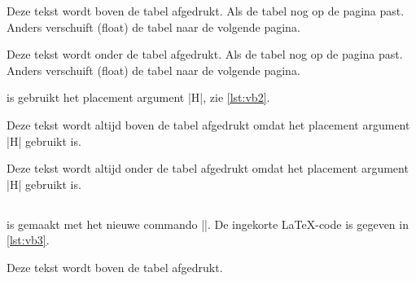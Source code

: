 \begin{llstShortInline}

	Deze tekst wordt boven de tabel afgedrukt. Als de tabel nog op de pagina past. Anders verschuift (float) de tabel naar de volgende pagina.

	
	Deze tekst wordt onder de tabel afgedrukt. Als de tabel nog op de pagina past. Anders verschuift (float) de tabel naar de volgende pagina.

	 is gebruikt het placement argument |H|, zie \cref{lst:vb2}.
	
	
	Deze tekst wordt altijd boven de tabel afgedrukt omdat het placement argument |H| gebruikt is.

	
	Deze tekst wordt altijd onder de tabel afgedrukt omdat het  placement argument |H| gebruikt is.
	
	\clearpage
	\subsection{\texorpdfstring{\lcode{\\langetabel}}{\textbackslash{}langetabel}}
	 is gemaakt met het nieuwe commando |\langetabel|. De ingekorte \LaTeX{}-code is gegeven in \cref{lst:vb3}.

	
	Deze tekst wordt boven de tabel afgedrukt.
	

\end{llstShortInline}
